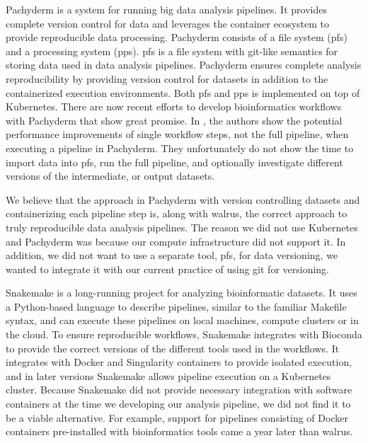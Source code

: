 Pachyderm is a system for running  big data analysis pipelines. It provides
complete version control for data and leverages the container ecosystem to
provide reproducible data processing.\cite{pachyderm} Pachyderm consists of a
file system (\gls{pfs}) and a processing system (\gls{pps}).  \gls{pfs} is a
file system with git-like semantics for storing data used in data analysis
pipelines. Pachyderm ensures complete analysis reproducibility by providing
version control for datasets in addition to the containerized execution
environments. Both \gls{pfs} and \gls{pps} is implemented on top of
Kubernetes.\cite{kubernetes} There are now recent efforts to develop
bioinformatics workflows with Pachyderm that show great
promise. In \cite{doi:10.1093/bioinformatics/bty699}, the authors show the
potential performance improvements of single workflow steps, not the full
pipeline, when executing a pipeline in Pachyderm. They unfortunately do not show
the time to import data into \gls{pfs}, run the full pipeline, and optionally
investigate different versions of the intermediate, or output datasets. 

We believe that the approach in Pachyderm with version controlling datasets and
containerizing each pipeline step is, along with walrus, the correct approach to
truly reproducible data analysis pipelines.  The reason we did not use
Kubernetes and Pachyderm was because our compute infrastructure did not support
it. In addition, we did not want to use a separate tool, \gls{pfs}, for data
versioning, we wanted to integrate it with our current practice of using git for
versioning.  

Snakemake is a long-running project for analyzing bioinformatic
datasets.\cite{koster2012snakemake} It uses a Python-based language to describe
pipelines, similar to the familiar Makefile syntax, and can execute these
pipelines on local machines, compute clusters or in the cloud. To ensure
reproducible workflows, Snakemake integrates with Bioconda to provide the
correct versions of the different tools used in the workflows. It integrates
with Docker and Singularity containers\cite{singularity} to provide isolated
execution, and in later versions Snakemake allows pipeline execution on a
Kubernetes cluster. Because Snakemake did not provide necessary integration with
software containers at the time we developing our analysis pipeline, we did not
find it to be a viable alternative. For example, support for pipelines
consisting of Docker containers pre-installed with bioinformatics tools came a
year later than walrus. 

